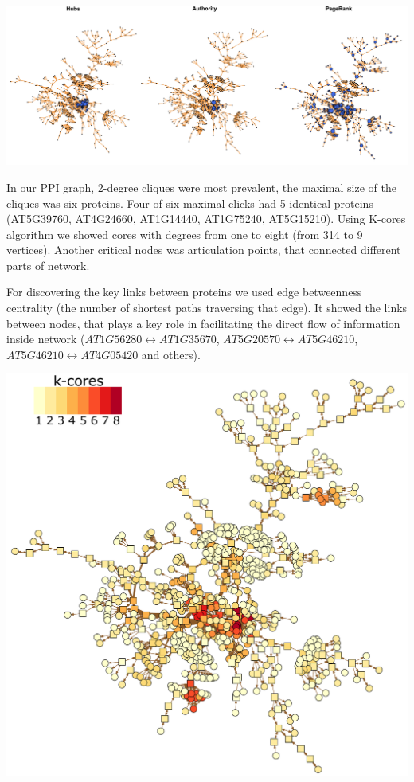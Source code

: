 \documentclass[a0,portrait]{a0poster}
\begin{document}
\begin{multicols}{2}
\begin{center}\vspace{.1cm}
\includegraphics[width=1\linewidth]{vscores.pdf}
\end{center}\vspace{.1cm}

In our PPI graph, 2-degree cliques were most prevalent, the maximal size of the cliques was six proteins. Four of six maximal clicks had 5 identical proteins (AT5G39760, AT4G24660, AT1G14440, AT1G75240, AT5G15210). Using K-cores algorithm we showed cores with degrees from one to eight (from 314 to 9 vertices). Another critical nodes was articulation points, that connected different parts of network.

For discovering the key links between proteins we used edge betweenness centrality (the number of shortest paths traversing that edge). It showed the links between nodes, that plays a key role in facilitating the direct flow of information inside network ($AT1G56280 \leftrightarrow AT1G35670$, $AT5G20570 \leftrightarrow AT5G46210$, $AT5G46210 \leftrightarrow AT4G05420$ and others). 


\begin{center}\vspace{1cm}
\includegraphics[width=0.8\linewidth]{cores.pdf}
\end{center}\vspace{1cm}



\end{multicols}
\end{document}
